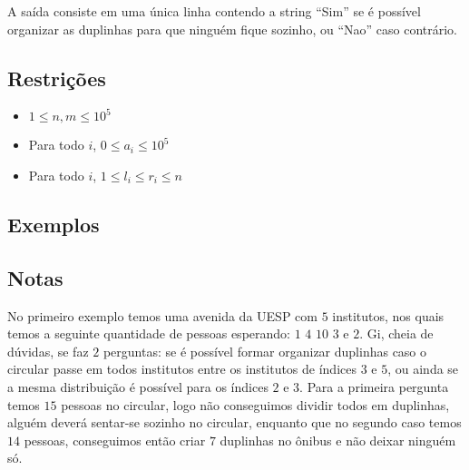 A saída consiste em uma única linha contendo a string ``Sim'' se é possível organizar as duplinhas para que ninguém fique sozinho, ou ``Nao'' caso contrário.


\subsection*{Restrições}
\begin{itemize}
	\item $1 \leq n, m \leq 10^5$
	\item Para todo $i$, $0 \leq a_i \leq 10^5$
	\item Para todo $i$, $1 \leq l_i \leq r_i \leq n$
\end{itemize}

\subsection*{Exemplos}


\subsection*{Notas}
No primeiro exemplo temos uma avenida da UESP com $5$ institutos, nos quais temos a seguinte quantidade de pessoas esperando: $1$ $4$ $10$ $3$ e $2$. Gi, cheia de dúvidas, se faz $2$ perguntas: se é possível formar organizar duplinhas caso o circular passe em todos institutos entre os institutos de índices $3$ e $5$, ou ainda se a mesma distribuição é possível para os índices $2$ e $3$. Para a primeira pergunta temos $15$ pessoas no circular, logo não conseguimos dividir todos em duplinhas, alguém deverá sentar-se sozinho no circular, enquanto que no segundo caso temos $14$ pessoas, conseguimos então criar $7$ duplinhas no ônibus e não deixar ninguém só.
